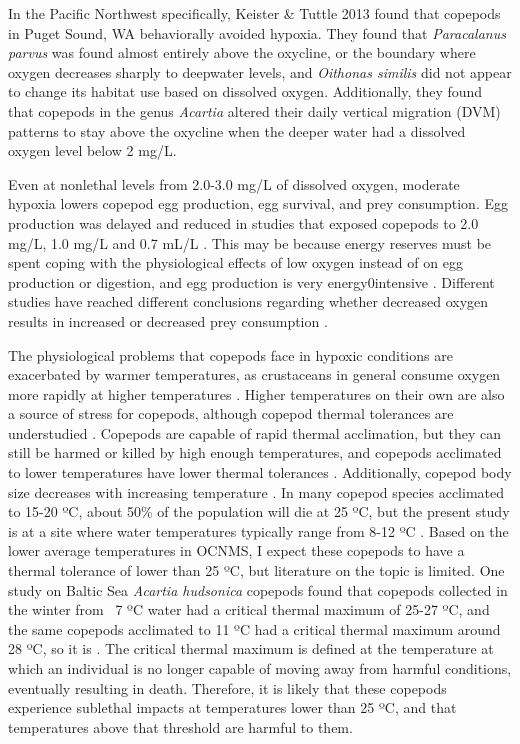 \documentclass[12pt,twoside]{reedthesis}
\begin{document}
In the Pacific Northwest specifically, Keister \& Tuttle 2013 found that copepods in Puget Sound, WA behaviorally avoided hypoxia. They found that \textit{Paracalanus parvus} was found almost entirely above the oxycline, or the boundary where oxygen decreases sharply to deepwater levels, and \textit{Oithonas similis} did not appear to change its habitat use based on dissolved oxygen. Additionally, they found that copepods in the genus \textit{Acartia} altered their daily vertical migration (DVM) patterns to stay above the oxycline when the deeper water had a dissolved oxygen level below 2 mg/L.

Even at nonlethal levels from 2.0-3.0 mg/L of dissolved oxygen, moderate hypoxia lowers copepod egg production, egg survival, and prey consumption. Egg production was delayed and reduced in studies that exposed copepods to 2.0 mg/L, 1.0 mg/L and 0.7 mL/L \autocite{Marcus2004, Richmond2006, Roman1993}. This may be because energy reserves must be spent coping with the physiological effects of low oxygen instead of on egg production or digestion, and egg production is very energy0intensive \autocite{Marcus2004, Elliott2013, Lutz1992, Stalder1997, Roff1992}.  Different studies have reached different conclusions regarding whether decreased oxygen results in increased or decreased prey consumption \autocite{He2021, Elliott2013}. 

The physiological problems that copepods face in hypoxic conditions are exacerbated by warmer temperatures, as crustaceans in general consume oxygen more rapidly at higher temperatures \autocite{Vaquer-Sunyer2011}. Higher temperatures on their own are also a source of stress for copepods, although copepod thermal tolerances are understudied \autocite{Sasaki2021}. Copepods are capable of rapid thermal acclimation, but they can still be harmed or killed by high enough temperatures, and copepods acclimated to lower temperatures have lower thermal tolerances \autocite{Sasaki2021, Hahn2024}.  Additionally, copepod body size decreases with increasing temperature \autocite{Hahn2024}.  In many copepod species acclimated to 15-20 ºC, about 50\% of the population will die at 25 ºC, but the present study is at a site where water temperatures typically range from 8-12 ºC \autocite{Sasaki2019, Sunar2021, Jiang2009}. Based on the lower average temperatures in OCNMS, I expect these copepods to have a thermal tolerance of lower than 25 ºC, but literature on the topic is limited. One study on Baltic Sea \textit{Acartia hudsonica} copepods found that copepods collected in the winter from ~7 ºC water had a critical thermal maximum of 25-27 ºC, and the same copepods acclimated to 11 ºC had a critical thermal maximum around 28 ºC, so it is \autocite{Hahn2024}. The critical thermal maximum is defined at the temperature at which an individual is no longer capable of moving away from harmful conditions, eventually resulting in death. Therefore, it is likely that these copepods experience sublethal impacts at temperatures lower than 25 ºC, and that temperatures above that threshold are harmful to them. 
\end{document}
